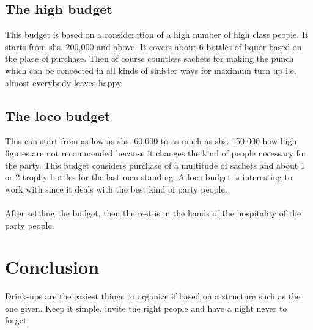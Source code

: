 \documentclass{article}
\begin{document}
\subsection{The high budget}
This budget is based on a consideration of a high number of high class people. It starts from shs. 200,000 and above. It covers about 6 bottles of liquor based on the place of purchase. Then of course countless sachets for making the punch which can be concocted in all kinds of sinister ways for maximum turn up i.e. almost everybody leaves happy.
\subsection{The loco budget}
 This can start from as low as shs. 60,000 to as much as shs. 150,000 how high figures are not recommended because it changes the kind of people necessary for the party. This budget considers purchase of a multitude of sachets and about 1 or 2 trophy bottles for the last men standing. A loco budget is interesting to work with since it deals with the best kind of party people.
\paragraph{}
After settling the budget, then the rest is in the hands of the hospitality of the party people.

\section{Conclusion}
Drink-ups are the easiest things to organize if based on a structure such as the one given. Keep it simple, invite the right people and have a night never to forget.
		
\end{document}
